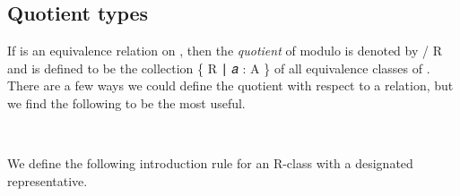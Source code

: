\documentclass[a4paper,UKenglish,cleveref,autoref,thm-restate,11pt]{lipics-v2021}
\begin{document}
\subsection{Quotient types}\label{sec:quotient-types}
If  is an equivalence relation on , then the \textit{quotient} of  modulo  is denoted by
 \af / \ab R and is defined to be the collection \{ \af [ \ab 𝑎 \af ] \ab R ∣  \ab 𝑎 \as : \ab A \} of all equivalence classes of . There are a few ways we could define the quotient with respect to a relation, but we find the following to be the most useful.
\ccpad
\begin{code}%
\>[1]\AgdaOperator{\AgdaFunction{\AgdaUnderscore{}/\AgdaUnderscore{}}}\AgdaSpace{}%
\AgdaSymbol{:}\AgdaSpace{}%
\AgdaSymbol{(}\AgdaSpace{}%
\AgdaSymbol{:}\AgdaSpace{}%
\AgdaSpace{}%
\AgdaSpace{}%
\AgdaSymbol{)}\AgdaSpace{}%
\AgdaSpace{}%
\AgdaSpace{}%
\AgdaSpace{}%
\AgdaSpace{}%
\AgdaSpace{}%
\AgdaSpace{}%
\AgdaSpace{}%
\AgdaSymbol{(}\AgdaSpace{}%
\AgdaSymbol{)}%
\<%
\\
%
\>[1]\AgdaSpace{}%
\AgdaOperator{\AgdaFunction{/}}\AgdaSpace{}%
\AgdaSpace{}%
\AgdaSymbol{=}\AgdaSpace{}%
\AgdaSpace{}%
\AgdaSpace{}%
\AgdaSpace{}%
\AgdaSpace{}%
\AgdaSpace{}%
\AgdaSymbol{\AgdaUnderscore{}}\AgdaSpace{}%
\AgdaFunction{,}%
\>[27]\AgdaSymbol{\{}\AgdaSymbol{\}\{}\AgdaSymbol{\}}\AgdaSpace{}%
\<%
\end{code}
\ccpad
We define the following introduction rule for an \ab R-class with a designated representative.
\ccpad
\begin{code}%
\>[1]\AgdaSpace{}%
\AgdaSymbol{:}\AgdaSpace{}%
\AgdaSymbol{\{}\AgdaSpace{}%
\AgdaSymbol{:}\AgdaSpace{}%
\AgdaSpace{}%
\AgdaSymbol{\}}\AgdaSpace{}%
\AgdaSpace{}%
\AgdaSpace{}%
\AgdaSpace{}%
\AgdaSymbol{\{}\AgdaSpace{}%
\AgdaSymbol{:}\AgdaSpace{}%
\AgdaSpace{}%
\AgdaSpace{}%
\AgdaSymbol{\}}\AgdaSpace{}%
\AgdaSpace{}%
\AgdaSpace{}%
\AgdaOperator{\AgdaFunction{/}}\AgdaSpace{}%
\<%
\\
%
\>[1]\AgdaSpace{}%
\AgdaSpace{}%
\AgdaSpace{}%
\AgdaSymbol{\{}\AgdaSymbol{\}}\AgdaSpace{}%
\AgdaSymbol{=}\AgdaSpace{}%
\AgdaOperator{\AgdaFunction{[}}\AgdaSpace{}%
\AgdaSpace{}%
\AgdaOperator{\AgdaFunction{]}}\AgdaSpace{}%
\AgdaSpace{}%
\AgdaOperator{\AgdaInductiveConstructor{,}}\AgdaSpace{}%
\AgdaSpace{}%
\AgdaOperator{\AgdaInductiveConstructor{,}}\AgdaSpace{}%
\<%
\end{code}
\end{document}
